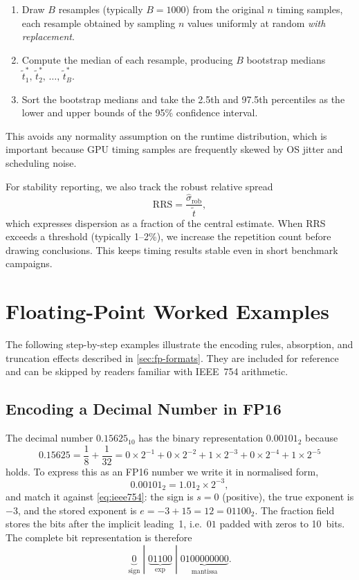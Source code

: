 \begin{enumerate}
  \item Draw $B$ resamples (typically $B = 1000$) from the original
    $n$ timing samples, each resample obtained by sampling $n$ values
    uniformly at random \emph{with replacement}.
  \item Compute the median of each resample, producing $B$ bootstrap
    medians $\tilde t_1^{*},\,\tilde t_2^{*},\,\dots,\,\tilde t_B^{*}$.
  \item Sort the bootstrap medians and take the 2.5th and 97.5th
    percentiles as the lower and upper bounds of the 95\% confidence
    interval.
\end{enumerate}

\noindent
This avoids any normality assumption on the runtime distribution, which is
important because GPU timing samples are frequently skewed by OS jitter and
scheduling noise.

For stability reporting, we also track the robust relative spread
\[
  \mathrm{RRS} = \frac{\hat\sigma_{\mathrm{rob}}}{\tilde t},
\]
which expresses dispersion as a fraction of the central estimate. When RRS
exceeds a threshold (typically 1--2\%), we increase the repetition count
before drawing conclusions. This keeps timing results stable even in short
benchmark campaigns.

\section{Floating-Point Worked Examples}\label{app:fp-worked-examples}

The following step-by-step examples illustrate the encoding rules,
absorption, and truncation effects described in
\cref{sec:fp-formats}. They are included for reference and can be
skipped by readers familiar with IEEE~754 arithmetic.

\subsection{Encoding a Decimal Number in FP16}\label{app:fp16-encoding}

The decimal number $0.15625_{10}$ has the binary representation $0.00101_2$ because
\[
  0.15625 = \frac{1}{8} + \frac{1}{32} = 0 \times 2^{-1} + 0 \times 2^{-2} + 1 \times 2^{-3} + 0 \times 2^{-4} + 1 \times 2^{-5}
\]
holds. To express this as an FP16 number we write it in normalised form,
\[
0.00101_2 = 1.01_2 \times 2^{-3},
\]
and match it against \cref{eq:ieee754}: the sign is $s = 0$ (positive), the true exponent is $-3$, and the stored exponent is $e = -3 + 15 = 12 = 01100_2$. The fraction field stores the bits after the implicit leading~1, i.e.\ $01$ padded with zeros to 10~bits. The complete bit representation is therefore
\[
  \underbrace{0}_{\text{sign}} \;|\; \underbrace{01100}_{\text{exp}} \;|\; \underbrace{0100000000}_{\text{mantissa}}.
\]

